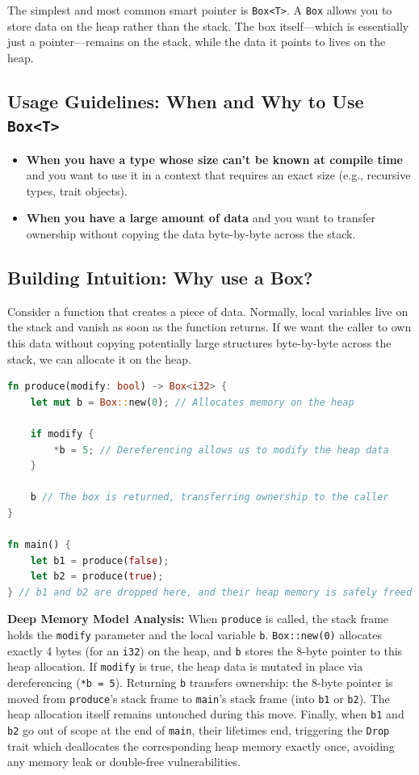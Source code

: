 The simplest and most common smart pointer is \texttt{Box<T>}. A \texttt{Box} allows you to store data on the heap rather than the stack. The box itself---which is essentially just a pointer---remains on the stack, while the data it points to lives on the heap.

\subsection*{Usage Guidelines: When and Why to Use \texttt{Box<T>}}
\begin{itemize}
    \item \textbf{When you have a type whose size can't be known at compile time} and you want to use it in a context that requires an exact size (e.g., recursive types, trait objects).
    \item \textbf{When you have a large amount of data} and you want to transfer ownership without copying the data byte-by-byte across the stack.
\end{itemize}

\subsection*{Building Intuition: Why use a Box?}
Consider a function that creates a piece of data. Normally, local variables live on the stack and vanish as soon as the function returns. If we want the caller to own this data without copying potentially large structures byte-by-byte across the stack, we can allocate it on the heap. 

\begin{lstlisting}[language=Rust]
fn produce(modify: bool) -> Box<i32> {
    let mut b = Box::new(0); // Allocates memory on the heap
    
    if modify {
        *b = 5; // Dereferencing allows us to modify the heap data
    }
    
    b // The box is returned, transferring ownership to the caller
}

fn main() {
    let b1 = produce(false);
    let b2 = produce(true);
} // b1 and b2 are dropped here, and their heap memory is safely freed
\end{lstlisting}

\textbf{Deep Memory Model Analysis:} When \texttt{produce} is called, the stack frame holds the \texttt{modify} parameter and the local variable \texttt{b}. \texttt{Box::new(0)} allocates exactly 4 bytes (for an \texttt{i32}) on the heap, and \texttt{b} stores the 8-byte pointer to this heap allocation. If \texttt{modify} is true, the heap data is mutated in place via dereferencing (\texttt{*b = 5}). Returning \texttt{b} transfers ownership: the 8-byte pointer is moved from \texttt{produce}'s stack frame to \texttt{main}'s stack frame (into \texttt{b1} or \texttt{b2}). The heap allocation itself remains untouched during this move. Finally, when \texttt{b1} and \texttt{b2} go out of scope at the end of \texttt{main}, their lifetimes end, triggering the \texttt{Drop} trait which deallocates the corresponding heap memory exactly once, avoiding any memory leak or double-free vulnerabilities.


